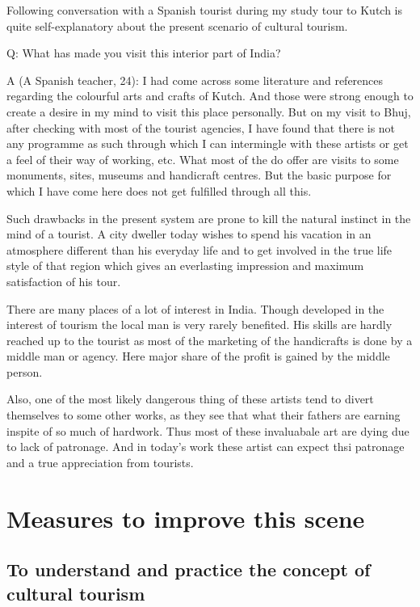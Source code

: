 Following conversation with a Spanish tourist during my study tour to Kutch is quite self-explanatory about the present scenario of cultural tourism.

Q: What has made you visit this interior part of India?

A (A Spanish teacher, 24): I had come across some literature and references regarding the colourful arts and crafts of Kutch. And those were strong enough to create a desire in my mind to visit this place personally. But on my visit to Bhuj, after checking with most of the tourist agencies, I have found that there is not any programme as such through which I can intermingle with these artists or get a feel of their way of working, etc. What most of the do offer are visits to some monuments, sites, museums and handicraft centres. But the basic purpose for which I have come here does not get fulfilled through all this.

Such drawbacks in the present system are prone to kill the natural instinct in the mind of a tourist. A city dweller today wishes to spend his vacation in an atmosphere different than his everyday life and to get involved in the true life style of that region which gives an everlasting impression and maximum satisfaction of his tour.

There are many places of a lot of interest in India. Though developed in the interest of tourism the local man is very rarely benefited. His skills are hardly reached up to the tourist as most of the marketing of the handicrafts is done by a middle man or agency. Here major share of the profit is gained by the middle person.

Also, one of the most likely dangerous thing of these artists tend to divert themselves to some other works, as they see that what their fathers are earning inspite of so much of hardwork. Thus most of these invaluabale art are dying due to lack of patronage. And in today's work these artist can expect thsi patronage and a true appreciation from tourists.


\section{Measures to improve this scene} %
\label{sec:measures}

\subsection{To understand and practice the concept of cultural tourism} %
\label{sub:concept_ct}

